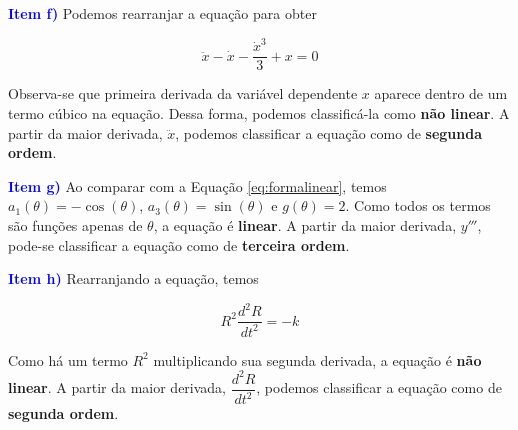 \documentclass[oneside,12pt,a4paper]{report}
\begin{document}
\begin{tcolorbox}[enhanced, breakable, colback=blue!1!white,colframe=blue!75!black,title=\textbf{\hyperlink{quest:ex1}{\hypertarget{resp:ex1}{Exercício 1}}}]
        \noindent \textcolor{blue}{\textbf{Item f)}} Podemos rearranjar a equação para obter

        $$\ddot{x}-\dot{x}-\frac{\dot{x}^3}{3}+x=0$$

        \noindent Observa-se que primeira derivada da variável dependente $x$ aparece dentro de um termo cúbico na equação. Dessa forma, podemos classificá-la como \textbf{não linear}. A partir da maior derivada, $\ddot{x}$, podemos classificar a equação como de \textbf{segunda ordem}.

        \noindent \textcolor{blue}{\textbf{Item g)}} Ao comparar com a Equação \ref{eq:formalinear}, temos $a_1(\theta)=-\cos(\theta)$, $a_3(\theta)=\sin(\theta)$ e $g(\theta)=2$. Como todos os termos são funções apenas de $\theta$, a equação é \textbf{linear}. A partir da maior derivada, $y'''$, pode-se classificar a equação como de \textbf{terceira ordem}.

        \noindent \textcolor{blue}{\textbf{Item h)}} Rearranjando a equação, temos

        $$R^2\frac{d^2R}{dt^2}=-k$$

        \noindent Como há um termo $R^2$ multiplicando sua segunda derivada, a equação é \textbf{não linear}. A partir da maior derivada, $\dfrac{d^2R}{dt^2}$, podemos classificar a equação como de \textbf{segunda ordem}.

        \end{tcolorbox}
        
\end{document}
